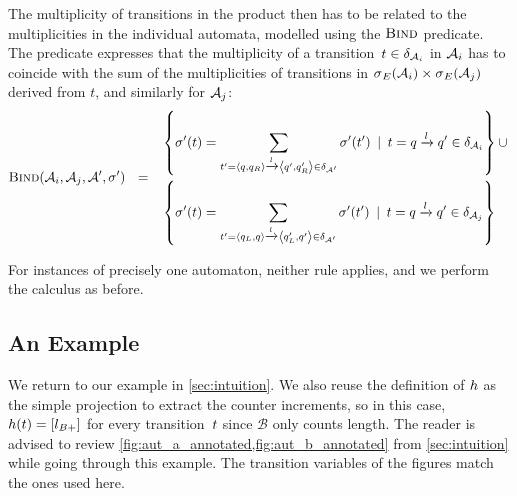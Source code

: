 The multiplicity of transitions in the product then has to be related
to the multiplicities in the individual automata, modelled using the
$\textsc{Bind}$ predicate. The predicate expresses that the multiplicity
of a transition~$t \in \delta_{\mathcal{A}_i}$ in
$\mathcal{A}_i$ has to coincide with the sum of the multiplicities of
transitions in $\operatorname{\sigma}_{E}(\mathcal{A}_i) \times \operatorname{\sigma}_{E}(\mathcal{A}_j)$ derived from $t$,
and similarly for $\mathcal{A}_j$:
%
  $$
  \textsc{Bind}(\mathcal{A}_i, \mathcal{A}_j, \mathcal{A}', \operatorname{\sigma}') ~~=~~
  \begin{aligned}
  & \left\{ 
    \operatorname{\sigma}'(t)  =  \sum\limits_{t' = \left\langle q, q_R\right\rangle \xrightarrow{l} \left\langle q', q'_R\right\rangle \in \delta_{\mathcal{A}'}} \operatorname{\sigma}'(t')
  \:\mid\: t = q \xrightarrow{l} q' \in \delta_{\mathcal{A}_i} \right\} \cup\mbox{} \\ 
  & \left\{
    \operatorname{\sigma}'(t)  =  \sum\limits_{t' = \left\langle q_L, q\right\rangle \xrightarrow{l} \left\langle q'_L, q'\right\rangle \in \delta_{\mathcal{A}'}} \operatorname{\sigma}'(t') \:\mid\: t = q \xrightarrow{l} q' \in \delta_{\mathcal{A}_j}
  \right\}
  \end{aligned}
$$

For instances of precisely one automaton, neither rule applies, and we perform
the calculus as before.

\subsection{An Example}\label{sec:multiple:example}

We return to our example in \cref{sec:intuition}. We also reuse the
definition of $h$ as the simple projection to extract the counter increments,
so in this case, $h(t) = \left[l_{B+}\right]$ for every
transition~$t$ since $\mathcal{B}$ only counts length. The reader is
advised to review \cref{fig:aut_a_annotated,fig:aut_b_annotated} from
\cref{sec:intuition} while going through this example.
The transition variables of the figures match the ones used here.

